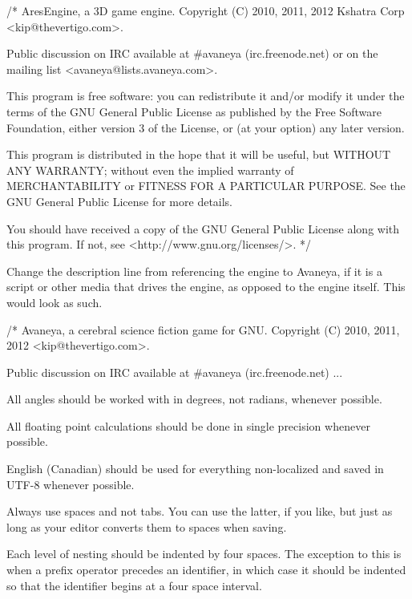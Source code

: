 \startCodeExample
/*
    AresEngine, a 3D game engine.
    Copyright (C) 2010, 2011, 2012 Kshatra Corp <kip@thevertigo.com>.

    Public discussion on IRC available at #avaneya (irc.freenode.net)
    or on the mailing list <avaneya@lists.avaneya.com>.

    This program is free software: you can redistribute it and/or modify
    it under the terms of the GNU General Public License as published by
    the Free Software Foundation, either version 3 of the License, or
    (at your option) any later version.

    This program is distributed in the hope that it will be useful,
    but WITHOUT ANY WARRANTY; without even the implied warranty of
    MERCHANTABILITY or FITNESS FOR A PARTICULAR PURPOSE.  See the
    GNU General Public License for more details.

    You should have received a copy of the GNU General Public License
    along with this program.  If not, see <http://www.gnu.org/licenses/>.
*/
\stopCodeExample

Change the description line from referencing the engine to Avaneya, if it is a script or other media that drives the engine, as opposed to the engine itself. This would look as such.

\startCodeExample
/*
    Avaneya, a cerebral science fiction game for GNU.
    Copyright (C) 2010, 2011, 2012 <kip@thevertigo.com>.

    Public discussion on IRC available at #avaneya (irc.freenode.net)
    ...
\stopCodeExample


\startitemize[4]
\item
All angles should be worked with in degrees, not radians, whenever possible.

\item
All floating point calculations should be done in single precision whenever possible.
\stopitemize


\startitemize[4]
\item
English (Canadian) should be used for everything non-localized and saved in UTF-8 whenever possible.

\item
Always use spaces and not tabs. You can use the latter, if you like, but just as long as your editor converts them to spaces when saving.

\item
Each level of nesting should be indented by four spaces. The exception to this is when a prefix operator precedes an identifier, in which case it should be indented so that the identifier begins at a four space interval.

